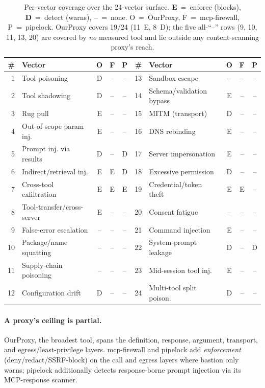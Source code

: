 \documentclass[sigconf,review,anonymous]{acmart}
\begin{document}
\begin{table}[t]
\caption{Per-vector coverage over the 24-vector surface. \textbf{E}~=~enforce (blocks), \textbf{D}~=~detect (warns), \textbf{--}~=~none. O~=~OurProxy, F~=~mcp-firewall, P~=~pipelock. OurProxy covers 19/24 (11~E, 8~D); the five all-``--'' rows (9, 10, 11, 13, 20) are covered by \emph{no} measured tool and lie outside any content-scanning proxy's reach.}
\label{tab:matrix}
\centering
\footnotesize
\setlength{\tabcolsep}{4pt}
\begin{tabular}{rl ccc @{\hspace{1.6em}} rl ccc}
\toprule
\# & Vector & O & F & P & \# & Vector & O & F & P \\
\midrule
1 & Tool poisoning & D & -- & -- & 13 & Sandbox escape & -- & -- & -- \\
2 & Tool shadowing & D & -- & -- & 14 & Schema/validation bypass & E & -- & -- \\
3 & Rug pull & E & -- & -- & 15 & MITM (transport) & D & -- & -- \\
4 & Out-of-scope param inj. & E & -- & -- & 16 & DNS rebinding & E & -- & -- \\
5 & Prompt inj. via results & D & -- & D & 17 & Server impersonation & E & -- & -- \\
6 & Indirect/retrieval inj. & E & E & D & 18 & Excessive permission & D & -- & -- \\
7 & Cross-tool exfiltration & E & E & E & 19 & Credential/token theft & E & E & -- \\
8 & Tool-transfer/cross-server & E & -- & -- & 20 & Consent fatigue & -- & -- & -- \\
9 & False-error escalation & -- & -- & -- & 21 & Command injection & E & -- & -- \\
10 & Package/name squatting & -- & -- & -- & 22 & System-prompt leakage & D & -- & D \\
11 & Supply-chain poisoning & -- & -- & -- & 23 & Mid-session tool inj. & E & -- & -- \\
12 & Configuration drift & D & -- & -- & 24 & Multi-tool split poison. & D & -- & -- \\
\bottomrule
\end{tabular}
\end{table}

\paragraph{A proxy's ceiling is partial.} OurProxy, the broadest tool, spans the definition, response, argument, transport, and egress/least-privilege layers. mcp-firewall and pipelock add \emph{enforcement} (deny/redact/SSRF-block) on the call and egress layers where bastion only warns; pipelock additionally detects response-borne prompt injection via its MCP-response scanner.
\end{document}
